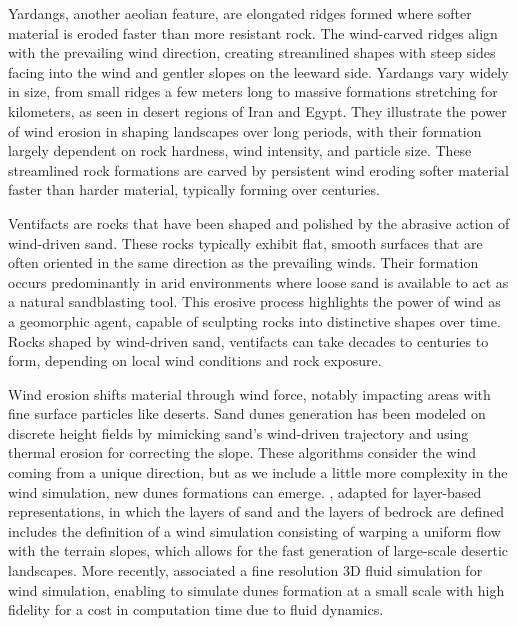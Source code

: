 Yardangs, another aeolian feature, are elongated ridges formed where softer material is eroded faster than more resistant rock. The wind-carved ridges align with the prevailing wind direction, creating streamlined shapes with steep sides facing into the wind and gentler slopes on the leeward side. Yardangs vary widely in size, from small ridges a few meters long to massive formations stretching for kilometers, as seen in desert regions of Iran and Egypt. They illustrate the power of wind erosion in shaping landscapes over long periods, with their formation largely dependent on rock hardness, wind intensity, and particle size. These streamlined rock formations are carved by persistent wind eroding softer material faster than harder material, typically forming over centuries.

Ventifacts are rocks that have been shaped and polished by the abrasive action of wind-driven sand. These rocks typically exhibit flat, smooth surfaces that are often oriented in the same direction as the prevailing winds. Their formation occurs predominantly in arid environments where loose sand is available to act as a natural sandblasting tool. This erosive process highlights the power of wind as a geomorphic agent, capable of sculpting rocks into distinctive shapes over time. Rocks shaped by wind-driven sand, ventifacts can take decades to centuries to form, depending on local wind conditions and rock exposure.


\smallConclusion

Wind erosion shifts material through wind force, notably impacting areas with fine surface particles like deserts. 
Sand dunes generation has been modeled on discrete height fields \cite{Roa2004} by mimicking sand's wind-driven trajectory and using thermal erosion for correcting the slope. These algorithms consider the wind coming from a unique direction, but as we include a little more complexity in the wind simulation, new dunes formations can emerge. \cite{Paris2019b}, adapted for layer-based representations, in which the layers of sand and the layers of bedrock are defined includes the definition of a wind simulation consisting of warping a uniform flow with the terrain slopes, which allows for the fast generation of large-scale desertic landscapes. More recently, \cite{Rosset2024} associated a fine resolution 3D fluid simulation for wind simulation, enabling to simulate dunes formation at a small scale with high fidelity for a cost in computation time due to fluid dynamics. 

